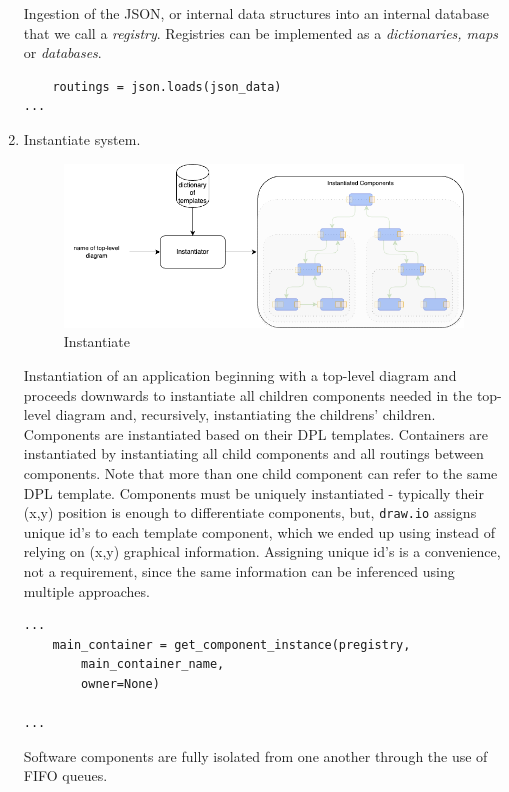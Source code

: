\documentclass[10pt,anonymous,review]{acmart}
\begin{document}
\begin{enumerate}
  Ingestion of the JSON, or internal data structures into an internal database that we call a \emph{registry}. Registries can be implemented as a \emph{dictionaries, maps} or \emph{databases}.

\begin{verbatim}
    routings = json.loads(json_data)
...
\end{verbatim}

\item Instantiate system.
  \begin{figure}[h]
    \centering
    \includegraphics[width=0.8\linewidth]{./media/image4.png}
    \caption{Instantiate}
    \label{fig:instantiate_system}
  \end{figure}

  Instantiation\cite{run} of an application beginning with a top-level diagram
and proceeds downwards to instantiate all children components needed in
the top-level diagram and, recursively, instantiating the childrens'
children. Components are instantiated based on their DPL templates.
Containers are instantiated by instantiating all child components and
all routings between components. Note that more than one child component
can refer to the same DPL template. Components must be uniquely
instantiated - typically their (x,y) position is enough to differentiate
components, but, \texttt{draw.io} assigns unique
id's to each template component, which we ended up using instead of
relying on (x,y) graphical information. Assigning unique id's is a
convenience, not a requirement, since the same information can be inferenced 
using multiple approaches.


\begin{verbatim}
...
    main_container = get_component_instance(pregistry,
        main_container_name,
        owner=None)

...
\end{verbatim}

Software components are fully isolated from one another through the use
of FIFO queues.


\end{enumerate}
\end{document}
